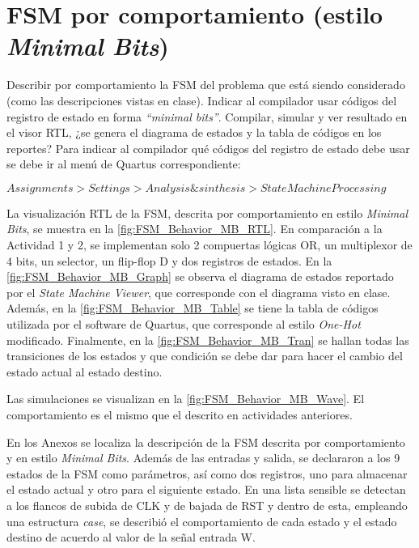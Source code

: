 \section{FSM por comportamiento (estilo \textit{Minimal Bits}) \label{sec:s3}}

\begin{center}
	\begin{minipage}{12cm}
		\begin{tcolorbox}[title=Actividad 3]
			 Describir por comportamiento la FSM del problema que está siendo considerado (como las descripciones vistas en clase). Indicar al compilador usar códigos del registro de estado en forma \textit{``minimal bits''}. Compilar, simular y ver resultado en el visor RTL, ¿se genera el diagrama de estados y la tabla de códigos en los reportes?
			 \enter
			 Para indicar al compilador qué códigos del registro de estado debe usar se debe ir al menú de Quartus correspondiente:\enter
			 
			 $Assignments > Settings > Analysis \& sinthesis > State Machine Processing$
		\end{tcolorbox}	
	\end{minipage}
\end{center}

La visualización RTL de la FSM, descrita por comportamiento en estilo \textit{Minimal Bits}, se muestra en la \autoref{fig:FSM_Behavior_MB_RTL}. En comparación a la Actividad 1 y 2, se implementan solo 2 compuertas lógicas OR, un multiplexor de 4 bits, un selector, un flip-flop D y dos registros de estados. En la \autoref{fig:FSM_Behavior_MB_Graph} se observa el diagrama de estados reportado por el \textit{State Machine Viewer}, que corresponde con el diagrama visto en clase. Además, en la \autoref{fig:FSM_Behavior_MB_Table} se tiene la tabla de códigos utilizada por el software de Quartus, que corresponde al estilo \textit{One-Hot} modificado. Finalmente, en la \autoref{fig:FSM_Behavior_MB_Tran} se hallan todas las transiciones de los estados y que condición se debe dar para hacer el cambio del estado actual al estado destino.

Las simulaciones se visualizan en la \autoref{fig:FSM_Behavior_MB_Wave}. El comportamiento es el mismo que el descrito en actividades anteriores.

En los Anexos se localiza la descripción de la FSM descrita por comportamiento y en estilo \textit{Minimal Bits}. Además de las entradas y salida, se declararon a los 9 estados de la FSM como parámetros, así como dos registros, uno para almacenar el estado actual y otro para el siguiente estado. En una lista sensible se detectan a los flancos de subida de CLK y de bajada de RST y dentro de esta, empleando una estructura \textit{case}, se describió el comportamiento de cada estado y el estado destino de acuerdo al valor de la señal entrada W.

